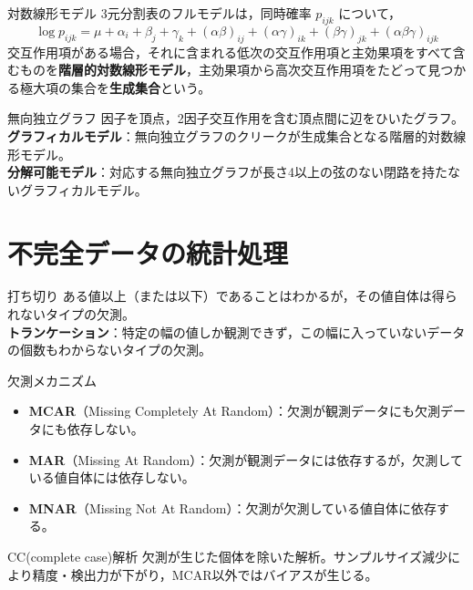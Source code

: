 \documentclass[a4paper,11pt]{ltjsarticle}
\begin{document}
\begin{term}{対数線形モデル}
3元分割表のフルモデルは，同時確率 $p_{ijk}$ について，
\[
\log p_{ijk} = \mu + \alpha_i+\beta_j+\gamma_k + (\alpha\beta)_{ij}+(\alpha\gamma)_{ik}+(\beta\gamma)_{jk}+(\alpha\beta\gamma)_{ijk}
\]
交互作用項がある場合，それに含まれる低次の交互作用項と主効果項をすべて含むものを\textbf{階層的対数線形モデル}，主効果項から高次交互作用項をたどって見つかる極大項の集合を\textbf{生成集合}という。
\end{term}

\begin{term}{無向独立グラフ}
因子を頂点，2因子交互作用を含む頂点間に辺をひいたグラフ。\\
\textbf{グラフィカルモデル}：無向独立グラフのクリークが生成集合となる階層的対数線形モデル。\\
\textbf{分解可能モデル}：対応する無向独立グラフが長さ4以上の弦のない閉路を持たないグラフィカルモデル。
\end{term}


\section{不完全データの統計処理}

\begin{term}{打ち切り}
ある値以上（または以下）であることはわかるが，その値自体は得られないタイプの欠測。\\
\textbf{トランケーション}：特定の幅の値しか観測できず，この幅に入っていないデータの個数もわからないタイプの欠測。
\end{term}

\begin{term}{欠測メカニズム}
\begin{itemize}
\item \textbf{MCAR}（Missing Completely At Random）：欠測が観測データにも欠測データにも依存しない。
\item \textbf{MAR}（Missing At Random）：欠測が観測データには依存するが，欠測している値自体には依存しない。
\item \textbf{MNAR}（Missing Not At Random）：欠測が欠測している値自体に依存する。
\end{itemize}
\end{term}

\begin{term}{CC(complete case)解析}
欠測が生じた個体を除いた解析。サンプルサイズ減少により精度・検出力が下がり，MCAR以外ではバイアスが生じる。
\end{term}
\end{document}
